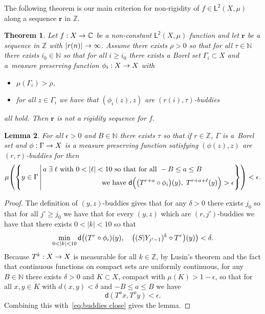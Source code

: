 \documentclass[10pt]{amsart}
\newtheorem{theo}{Theorem}[section]
\newtheorem{lemm}[theo]{Lemma}\newtheorem{prop}[theo]{Proposition}\newtheorem{coro}[theo]{Corollary}\newtheorem{conj}[theo]{Conjecture}
\theoremstyle{definition}\newtheorem{defi}[theo]{Definition}\newtheorem{rema}[theo]{Remark}\newtheorem{exam}[theo]{Example}\newtheorem{exem}[theo]{Example}\newtheorem{nota}[theo]{Notation}
\newcommand{\N}{\mathbb{N}}
\newcommand{\Z}{\mathbb{Z}}
\newcommand{\bbC}{\mathbb{C}}
\newcommand{\metric}{\mathsf{d}}
\newcommand{\lp}{\mathsf{L}}
\newcommand{\ltwo}{\lp^{\!\mathsf{2}}}
\newcommand{\bfr}{\mathbf{r}}
\let\originalleft\left
\let\originalright\right
\renewcommand{\left}{\mathopen{}\mathclose\bgroup\originalleft}
\renewcommand{\right}{\aftergroup\egroup\originalright}
\renewcommand*{\to}{\mathchoice{\longrightarrow}{\rightarrow}{\rightarrow}{\rightarrow}}
\let\oldexists\exists
\renewcommand*{\exists}{\mathrel{\oldexists}}
\begin{document}
The following theorem is our main criterion for non-rigidity of $f \in \ltwo(X,\mu)$ along a sequence $\bfr$ in $\Z$.

\begin{theo}\label{thm:getting_constant weak}
Let $f:X \to \bbC$ be a non-constant $\ltwo(X,\mu)$ function and let $\bfr$ be a sequence in $\Z$ with $|r(n)| \to \infty$. Assume there exists $\rho>0$ so that for all $\tau \in \N$ there exists $ i_0 \in \N$ so that for all $i\geq i_0$ there exists a Borel set $\Gamma_i \subset X$ and a~measure preserving function $\phi_i : X \to X$ with
\begin{itemize}
\item $\mu(\Gamma_i) > \rho$,
\item for all $z \in \Gamma_i$ we have that $(\phi_i(z),z)$ are $(r(i),\tau)$-buddies
\end{itemize}
all hold. Then $\bfr$ is not a rigidity sequence for $f$.
\end{theo}

\begin{lemm}\label{lem:same power}
For all $\epsilon>0$ and $B\in \N$ there exists $\tau$ so that if $r \in \Z$, $\Gamma$ is a~Borel set and $\phi:\Gamma \to X$ is a measure preserving function satisfying $(\phi(z),z)$ are $(r,\tau)$-buddies for then
\[
\mu
\left(
\left\{ y\in \Gamma\,\middle|\,
\begin{aligned}
&a\exists \ell \text{ with }0<|\ell|<10 \text{ so that for all }-B\leq a\leq B\\
&\mkern150mu\text{we have } \metric \Big(\left(T^{r+a} \circ \phi_i\right)(y),\; T^{r+a+\ell}(y) \Big) > \epsilon
\end{aligned}
\right\}
\right) <\epsilon.
\]
\end{lemm}

\begin{proof}
The definition of $(y,z)$-buddies gives that for any $\delta>0$ there exists $j_0$ so that for all $j'\geq j_0$ we have that for every $(y,z)$ which are $(r,j')$-buddies we have that there exists $0<|k|<10$ so that
\begin{equation}\label{eq:buddies close}
\min_{0<|k|<10}\metric\left((T^{r} \circ \phi_i)(y),\quad\left((S|Y_{j'-1})^k \circ T^{r}\right)(y)\right)<\delta.
\end{equation}
Because $T^k:X \to X$ is measurable for all $k \in \Z$, by Lusin's theorem and the fact that continuous functions on compact sets are uniformly continuous, for any $B \in \N$ there exists $\delta>0$ and $K \subset X$, compact with $\mu(K)>1-\epsilon$, so that for all $x,y \in K$ with $d(x,y)<\delta$ and $-B\leq a\leq B $ we have
\[
\metric(T^ax,T^ay)<\epsilon.
\]
Combining this with~\eqref{eq:buddies close} gives the lemma.
\end{proof}
\end{document}
